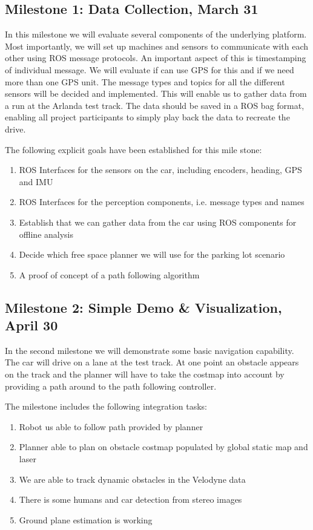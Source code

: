 \documentclass[11pt,a4paper]{article}
\begin{document}
\subsection{Milestone 1: Data Collection, March 31}
\label{milestone1}

In this milestone we will evaluate several components of the underlying platform.
Most importantly, we will set up machines and sensors to communicate with each
other using ROS message protocols. An important aspect of this is timestamping
of individual message. We will evaluate if can use GPS for this and if we need
more than one GPS unit. The message types and topics for all the different sensors
will be decided and implemented. This will enable us to gather data from a run
at the Arlanda test track. The data should be saved in a ROS bag format, enabling
all project participants to simply play back the data to recreate the drive.

The following explicit goals have been established for this mile stone:
\begin{enumerate}
\item ROS Interfaces for the sensors on the car, including encoders, heading, GPS and IMU
\item ROS Interfaces for the perception components, i.e. message types and names
\item Establish that we can gather data from the car using ROS components for offline analysis
\item Decide which free space planner we will use for the parking lot scenario
\item A proof of concept of a path following algorithm
\end{enumerate}

\subsection{Milestone 2: Simple Demo \& Visualization, April 30}
\label{milestone2}

In the second milestone we will demonstrate some basic navigation capability.
The car will drive on a lane at the test track. At one point an
obstacle appears on the track and the planner will have to take the costmap
into account by providing a path around to the path following controller.

The milestone includes the following integration tasks:
\begin{enumerate}
\item Robot us able to follow path provided by planner
\item Planner able to plan on obstacle costmap populated by global static map and laser
\item We are able to track dynamic obstacles in the Velodyne data
\item There is some humans and car detection from stereo images
\item Ground plane estimation is working
\end{enumerate}
\end{document}
